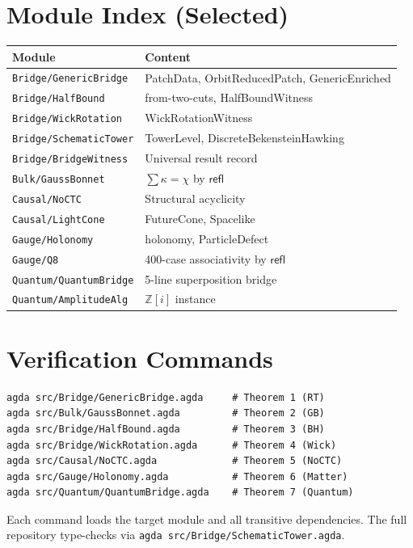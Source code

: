 \documentclass[11pt,a4paper]{article}
\newcommand{\Qi}{\mathbb{Z}[i]}
\newcommand{\refl}{\mathsf{refl}}
\newcommand{\module}[1]{\texttt{#1}}
\begin{document}
\appendix
\section{Module Index (Selected)}
\label{app:modules}

\begin{center}
\small
\begin{tabular}{ll}
\toprule
Module & Content \\
\midrule
\module{Bridge/GenericBridge} & PatchData, OrbitReducedPatch,
  GenericEnriched \\
\module{Bridge/HalfBound} & from-two-cuts, HalfBoundWitness \\
\module{Bridge/WickRotation} & WickRotationWitness \\
\module{Bridge/SchematicTower} & TowerLevel, DiscreteBekensteinHawking \\
\module{Bridge/BridgeWitness} & Universal result record \\
\module{Bulk/GaussBonnet} & $\sum\kappa = \chi$ by $\refl$ \\
\module{Causal/NoCTC} & Structural acyclicity \\
\module{Causal/LightCone} & FutureCone, Spacelike \\
\module{Gauge/Holonomy} & holonomy, ParticleDefect \\
\module{Gauge/Q8} & 400-case associativity by $\refl$ \\
\module{Quantum/QuantumBridge} & 5-line superposition bridge \\
\module{Quantum/AmplitudeAlg} & $\Qi$ instance \\
\bottomrule
\end{tabular}
\end{center}

\section{Verification Commands}
\label{app:verification}

\begin{verbatim}
agda src/Bridge/GenericBridge.agda     # Theorem 1 (RT)
agda src/Bulk/GaussBonnet.agda         # Theorem 2 (GB)
agda src/Bridge/HalfBound.agda         # Theorem 3 (BH)
agda src/Bridge/WickRotation.agda      # Theorem 4 (Wick)
agda src/Causal/NoCTC.agda             # Theorem 5 (NoCTC)
agda src/Gauge/Holonomy.agda           # Theorem 6 (Matter)
agda src/Quantum/QuantumBridge.agda    # Theorem 7 (Quantum)
\end{verbatim}

Each command loads the target module and all transitive dependencies.
The full repository type-checks via
\texttt{agda src/Bridge/SchematicTower.agda}.
\end{document}
